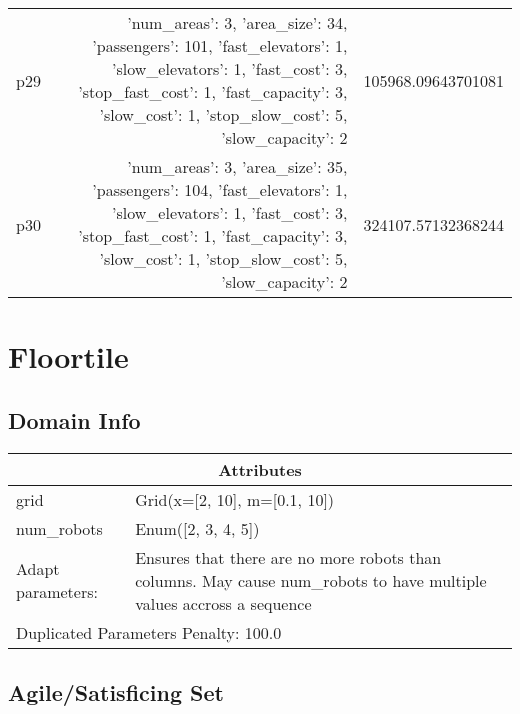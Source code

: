 \documentclass{article}
\begin{document}
\begin{center}
\begin{tabular}{r|r|r}
  p29&{'num\_areas': 3, 'area\_size': 34, 'passengers': 101, 'fast\_elevators': 1, 'slow\_elevators': 1, 'fast\_cost': 3, 'stop\_fast\_cost': 1, 'fast\_capacity': 3, 'slow\_cost': 1, 'stop\_slow\_cost': 5, 'slow\_capacity': 2}&105968.09643701081\\
  p30&{'num\_areas': 3, 'area\_size': 35, 'passengers': 104, 'fast\_elevators': 1, 'slow\_elevators': 1, 'fast\_cost': 3, 'stop\_fast\_cost': 1, 'fast\_capacity': 3, 'slow\_cost': 1, 'stop\_slow\_cost': 5, 'slow\_capacity': 2}&324107.57132368244
                            \end{tabular}
                            \end{center}
                    
                            \newpage \section{Floortile}
                    \subsection*{Domain Info}

                    \begin{center}
                    \begin{tabular}{p{}p{}}
                    \multicolumn{2}{c}{\bf \large Attributes}\\\midrule
                    grid & Grid(x=[2, 10], m=[0.1, 10])\\
num\_robots & Enum([2, 3, 4, 5])
                    
                    \\\midrule
                    Adapt parameters: & Ensures that there are no more robots than columns. May cause num\_robots to have multiple values accross a sequence
                
                     \\\midrule
                    \multicolumn{2}{l}{Duplicated Parameters Penalty: 100.0}
                    \end{tabular}
                    \end{center}
                
                         \subsection*{Agile/Satisficing Set}
\end{document}
